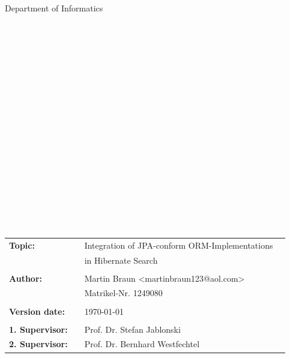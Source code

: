 \begin{center}
\Large{Department of Informatics}
\end{center}
\begin{verbatim}








\end{verbatim}
\begin{center}
\doublespacing
\textbf{\LARGE{\titleDocument}}\\
\singlespacing
\begin{verbatim}

\end{verbatim}
\textbf{{~\subjectDocument}}
\end{center}
\begin{verbatim}

\end{verbatim}
\begin{center}

\end{center}
\begin{verbatim}






\end{verbatim}
\begin{flushleft}
\begin{tabular}{llll}
\textbf{Topic:} & & Integration of JPA-conform ORM-Implementations & \\
	& & in Hibernate Search & \\
& & \\
\textbf{Author:} & & Martin Braun <martinbraun123@aol.com>& \\
& & Matrikel-Nr. 1249080 & \\
& & \\
\textbf{Version date:} & & \today &\\
& & \\
\textbf{1. Supervisor:} & & Prof. Dr. Stefan Jablonski &\\
\textbf{2. Supervisor:} & & Prof. Dr. Bernhard Westfechtel &\\
\end{tabular}
\end{flushleft}